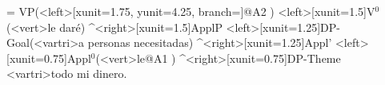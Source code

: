 \begin{exe}
	\ex
	\jtree[xunit=2,labelgap=0.2]
	\! = {VP}(<left>[xunit=1.75, yunit=4.25, branch=\blank]{}@A2 )
	<left>[xunit=1.5]{V$^{0}$}(<vert>{le dar\'{e}}) ^<right>[xunit=1.5]{ApplP}
	<left>[xunit=1.25]{DP-Goal}(<vartri>{a personas necesitadas}) ^<right>[xunit=1.25]{Appl'}
	<left>[xunit=0.75]{Appl$^{0}$}(<vert>{le}@A1 ) ^<right>[xunit=0.75]{DP-Theme} <vartri>{todo mi dinero}.
	\endjtree
\end{exe}
